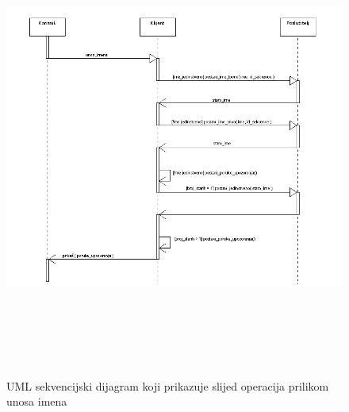 \begin{figure}[h!]
\centering
\includegraphics[width=6.1in, height=6in]{figures/Unos_imena.png}
\caption{UML sekvencijski dijagram koji prikazuje slijed operacija prilikom
unosa imena}
\label{fig:imena}
\end{figure}

